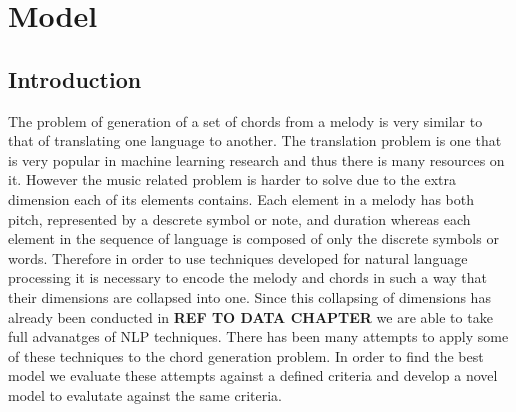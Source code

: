 
\chapter{Model} %

\label{Chapter4} %


\newcommand{\keyword}[1]{\textbf{#1}}
\newcommand{\tabhead}[1]{\textbf{#1}}
\newcommand{\code}[1]{\texttt{#1}}
\newcommand{\file}[1]{\texttt{\bfseries#1}}
\newcommand{\option}[1]{\texttt{\itshape#1}}



\section{Introduction}


The problem of generation of a set of chords from a melody is very similar to that of translating one language to another. 
The translation problem is one that is very popular in machine learning research and thus there is many resources on it.  
However the music related problem is harder to solve due to the extra dimension each of its elements contains. 
Each element in a melody has both pitch, represented by a descrete symbol or note, and duration whereas each element in the sequence of language is composed of only the discrete symbols or words.  
Therefore in order to use techniques developed for natural language processing it is necessary to encode the melody and chords in such a way that their dimensions are collapsed into one. 
Since this collapsing of dimensions has already been conducted in \textbf{REF TO DATA CHAPTER} we are able to take full advanatges of NLP techniques.
There has been many attempts to apply some of these techniques to the chord generation problem. 
In order to find the best model we evaluate these attempts against a defined criteria and develop a novel model to evalutate against the same criteria.



